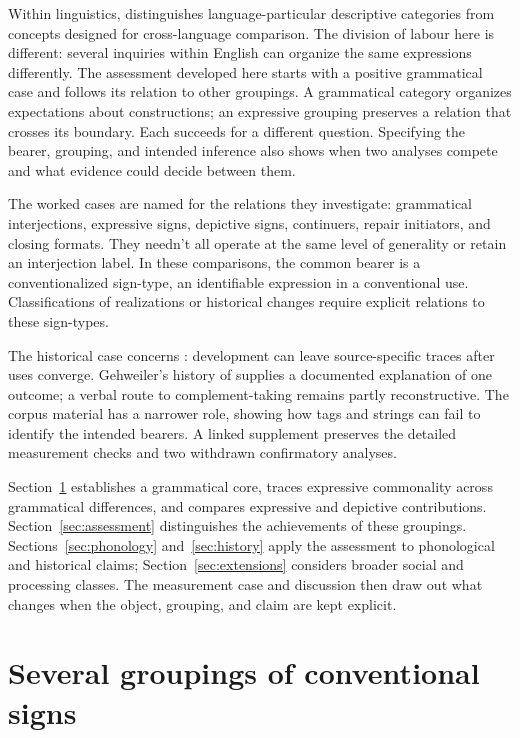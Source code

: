 \documentclass[12pt]{article}
\begin{document}
Within linguistics, \textcite[663, 666, 680]{haspelmath2010} distinguishes
language-particular descriptive categories from concepts designed for
cross-language comparison. The division of labour here is different:
several inquiries within English can organize the same expressions
differently. The assessment developed here starts with a positive grammatical
case and follows its relation to other groupings. A grammatical category
organizes expectations about constructions; an expressive grouping preserves
a relation that crosses its boundary. Each succeeds for a different
question. Specifying the bearer, grouping, and intended inference also
shows when two analyses compete and what evidence could decide between them.

The worked cases are named for the relations they investigate: grammatical
interjections, expressive signs, depictive signs, continuers, repair
initiators, and closing formats. They needn't all operate at the same level
of generality or retain an interjection label. In these comparisons, the
common bearer is a conventionalized sign-type, an identifiable expression
in a conventional use. Classifications of realizations or historical
changes require explicit relations to these sign-types.

The historical case concerns : development can leave
source-specific traces after uses converge. Gehweiler's history of
 supplies a documented explanation of one outcome; a verbal
route to complement-taking  remains partly reconstructive.
The corpus material has a narrower role, showing how tags and strings
can fail to identify the intended bearers. A linked supplement preserves
the detailed measurement checks and two withdrawn confirmatory analyses.

Section~\ref{sec:worked} establishes a grammatical core, traces expressive
commonality across grammatical differences, and compares expressive and depictive
contributions. Section~\ref{sec:assessment} distinguishes the achievements
of these groupings. Sections~\ref{sec:phonology} and~\ref{sec:history}
apply the assessment to phonological and historical claims;
Section~\ref{sec:extensions} considers broader social and processing
classes. The measurement case and discussion then draw out what changes
when the object, grouping, and claim are kept explicit.

\section{Several groupings of conventional signs}\label{sec:worked}
\end{document}

